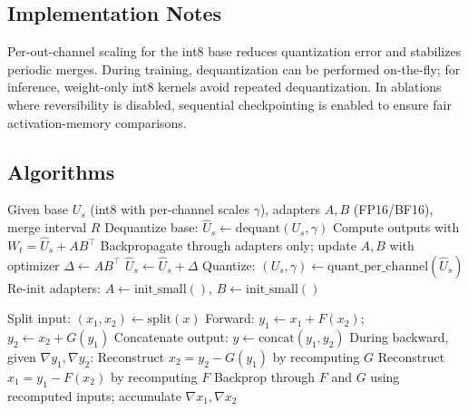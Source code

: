 \documentclass{article}
\begin{document}
\subsection{Implementation Notes}
Per-out-channel scaling for the int8 base reduces quantization error and stabilizes periodic merges. During training, dequantization can be performed on-the-fly; for inference, weight-only int8 kernels avoid repeated dequantization. In ablations where reversibility is disabled, sequential checkpointing is enabled to ensure fair activation-memory comparisons.

\subsection{Algorithms}
\begin{algorithm}[t]
\caption{Periodic ReLoRA merge with shared int8 base}
\begin{algorithmic}[1]
\State Given base \(U_s\) (int8 with per-channel scales \(\gamma\)), adapters \(A, B\) (FP16/BF16), merge interval \(R\)
  \State Dequantize base: \(\hat{U}_s \leftarrow \mathrm{dequant}(U_s, \gamma)\)
  \State Compute outputs with \(W_t = \hat{U}_s + A B^{\top}\)
  \State Backpropagate through adapters only; update \(A, B\) with optimizer
    \State \(\Delta \leftarrow A B^{\top}\)
    \State \(\hat{U}_s \leftarrow \hat{U}_s + \Delta\)
    \State Quantize: \((U_s, \gamma) \leftarrow \mathrm{quant\_per\_channel}(\hat{U}_s)\)
    \State Re-init adapters: \(A \leftarrow \mathrm{init\_small}()\), \(B \leftarrow \mathrm{init\_small}()\)
  \EndIf
\EndFor
\end{algorithmic}
\end{algorithm}

\begin{algorithm}[t]
\caption{Reversible transformer block with recomputation}
\begin{algorithmic}[1]
\State Split input: \((x_1, x_2) \leftarrow \mathrm{split}(x)\)
\State Forward: \(y_1 \leftarrow x_1 + F(x_2)\); \(y_2 \leftarrow x_2 + G(y_1)\)
\State Concatenate output: \(y \leftarrow \mathrm{concat}(y_1, y_2)\)
\State During backward, given \(\nabla y_1, \nabla y_2\):
\State Reconstruct \(x_2 = y_2 - G(y_1)\) by recomputing \(G\)
\State Reconstruct \(x_1 = y_1 - F(x_2)\) by recomputing \(F\)
\State Backprop through \(F\) and \(G\) using recomputed inputs; accumulate \(\nabla x_1, \nabla x_2\)
\end{algorithmic}
\end{algorithm}
\end{document}
